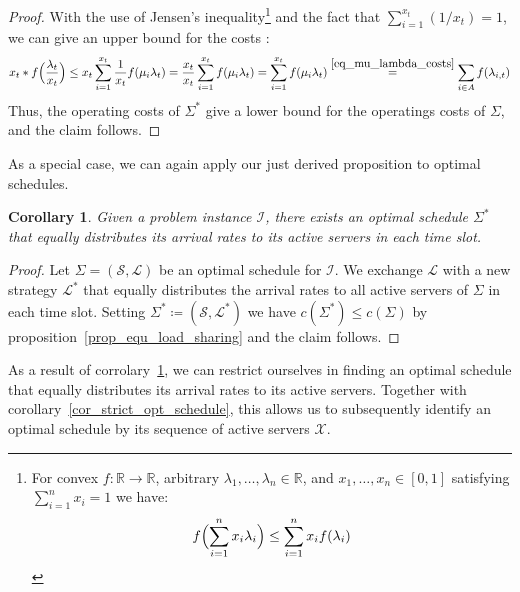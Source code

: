 \documentclass[hidelinks]{article}
\theoremstyle{plain}
\newtheorem{cor}[thm]{Corollary}
\theoremstyle{definition}
\theoremstyle{rem}
\newcommand{\mx}{\mathcal{X}}
\newcommand{\inp}{\mathcal{I}}
\newcommand{\costs}{c}
\begin{document}
\begin{proof}
With the use of Jensen's inequality\footnote{For convex $f:\mathbb{R}\rightarrow\mathbb{R}$, arbitrary $\lambda_1,\ldots,\lambda_n\in\mathbb{R}$, and $x_1,\ldots,x_n\in[0,1]$ satisfying $\sum\limits_{i=1}^{n}x_i=1$ we have: 
\begin{equation*}
	f\Bigl(\sum_{i=1}^n x_i \lambda_i\Bigr) \leq \sum_{i=1}^n x_i f(\lambda_i)
\end{equation*}} and the fact that $\sum_{i=1}^{x_t}(1/x_t)=1$, we can give an upper bound for the costs :
\begin{align*}
	x_t*f\Bigl(\frac{\lambda_t}{x_t}\Bigr)\le x_t\sum\limits_{i=1}^{x_t}\frac{1}{x_t}f(\mu_i\lambda_t)=\frac{x_t}{x_t}\sum\limits_{i=1}^{x_t}f(\mu_i\lambda_t)=\sum\limits_{i=1}^{x_t}f(\mu_i\lambda_t)\stackrel{\eqref{eq_mu_lambda_costs}}{=}\sum\limits_{i\in A}f(\lambda_{i,t})
\end{align*}
Thus, the operating costs of $\Sigma^*$ give a lower bound for the operatings costs of $\Sigma$, and the claim follows.
\end{proof}
As a special case, we can again apply our just derived proposition to optimal schedules.
\begin{cor}\label{cor_equ_load_sharing}
Given a problem instance $\inp$, there exists an optimal schedule $\Sigma^*$ that equally distributes its arrival rates to its active servers in each time slot.
\end{cor}
\begin{proof}
Let $\Sigma=(\mathcal{S},\mathcal{L})$ be an optimal schedule for $\inp$. We exchange $\mathcal{L}$ with a new strategy $\mathcal{L}^*$ that equally distributes the arrival rates to all active servers of $\Sigma$ in each time slot. Setting $\Sigma^*\coloneqq(\mathcal{S},\mathcal{L}^*)$ we have $\costs(\Sigma^*)\leq \costs(\Sigma)$ by proposition~\ref{prop_equ_load_sharing} and the claim follows.
\end{proof}
As a result of corrolary~\ref{cor_equ_load_sharing}, we can restrict ourselves in finding an optimal schedule that equally distributes its arrival rates to its active servers. Together with corollary~\ref{cor_strict_opt_schedule}, this allows us to subsequently identify an optimal schedule by its sequence of active servers $\mx$. 
\end{document}

